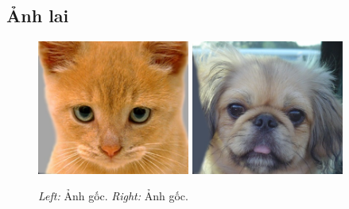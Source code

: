 \subsection*{Ảnh lai}
\begin{figure}[H]
    \centering
    \includegraphics[width=5cm]{images/results_part2/cat_dog/01_cat.jpg}
    \includegraphics[width=5cm]{images/results_part2/cat_dog/01_dog.jpg}
    \caption{\emph{Left:} Ảnh gốc. \emph{Right:} Ảnh gốc.}
\end{figure}

